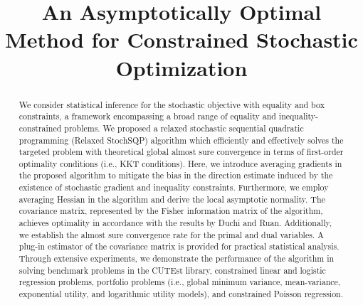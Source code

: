 \documentclass[aos]{imsart}
\numberwithin{equation}{section}
\theoremstyle{plain}
\begin{document}
\begin{frontmatter}

\title{An Asymptotically Optimal Method for Constrained Stochastic Optimization}


\begin{abstract}
We consider statistical inference for the stochastic objective with equality and box constraints, a framework encompassing a broad range of equality and inequality-constrained problems. We proposed a relaxed stochastic sequential quadratic programming (Relaxed StochSQP) algorithm which efficiently and effectively solves the targeted problem with theoretical global almost sure convergence in terms of first-order optimality conditions (i.e., KKT conditions). Here, we introduce averaging gradients in the proposed algorithm to mitigate the bias in the direction estimate induced by the existence of stochastic gradient and inequality constraints. Furthermore, we employ averaging Hessian in the algorithm and derive the local asymptotic normality.  The covariance matrix, represented by the Fisher information matrix of the algorithm, achieves optimality in accordance with the results by Duchi and Ruan. Additionally, we establish the almost sure convergence rate for the primal and dual variables. A plug-in estimator of the covariance matrix is provided for practical statistical analysis. Through extensive experiments, we demonstrate the performance of the algorithm in solving benchmark problems in the CUTEst library, constrained linear and logistic regression problems, portfolio problems (i.e., global minimum variance, mean-variance, exponential utility, and logarithmic utility models), and constrained Poisson regression.
\end{abstract}


\begin{keyword}
\end{keyword}

\end{frontmatter}
\end{document}
